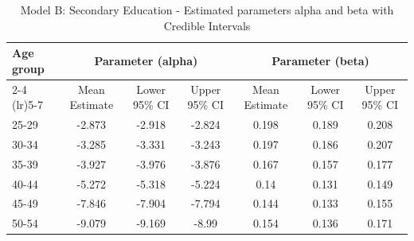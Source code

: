 \begin{landscape}
\begin{table}[htbp]
\centering
\caption{Model B: Secondary Education - Estimated parameters alpha and beta  with Credible Intervals}
\label{tab:Fparameters_ab7}
\begin{tabular}{@{}lcccccc@{}}
\toprule
Age group & \multicolumn{3}{c}{Parameter (alpha)} & \multicolumn{3}{c}{Parameter (beta)} \\ 
\cmidrule(lr){2-4} \cmidrule(lr){5-7}
          & Mean Estimate & Lower 95\% CI & Upper 95\% CI & Mean Estimate & Lower 95\% CI & Upper 95\% CI \\ 
\midrule
25-29 & -2.873 & -2.918 & -2.824 & 0.198 & 0.189 & 0.208 \\
30-34 & -3.285 & -3.331 & -3.243 & 0.197 & 0.186 & 0.207 \\
35-39 & -3.927 & -3.976 & -3.876 & 0.167 & 0.157 & 0.177 \\
40-44 & -5.272 & -5.318 & -5.224 & 0.14 & 0.131 & 0.149 \\
45-49 & -7.846 & -7.904 & -7.794 & 0.144 & 0.133 & 0.155 \\
50-54 & -9.079 & -9.169 & -8.99 & 0.154 & 0.136 & 0.171 \\
\bottomrule
\end{tabular}
\end{table}
\end{landscape}